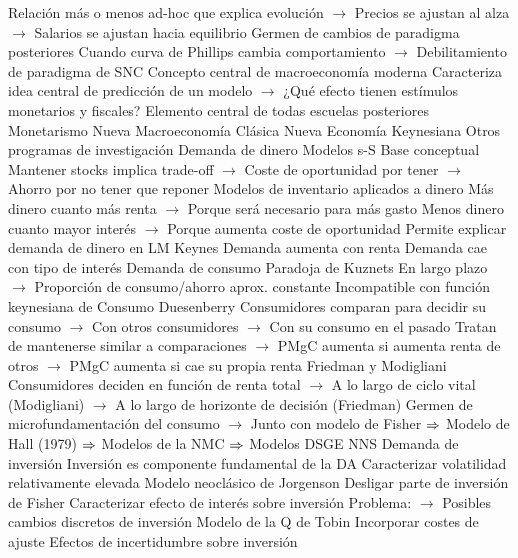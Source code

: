\documentclass{nuevotema}
\begin{document}
\begin{esquemal}
				\4[] Relación más o menos ad-hoc que explica evolución
				\4[] $\to$ Precios se ajustan al alza
				\4[] $\to$ Salarios se ajustan hacia equilibrio
				\4 Germen de cambios de paradigma posteriores
				\4[] Cuando curva de Phillips cambia comportamiento
				\4[] $\to$ Debilitamiento de paradigma de SNC
				\4 Concepto central de macroeconomía moderna
				\4[] Caracteriza idea central de predicción de un modelo
				\4[] $\to$ ¿Qué efecto tienen estímulos monetarios y fiscales?
				\4 Elemento central de todas escuelas posteriores
				\4[] Monetarismo
				\4[] Nueva Macroeconomía Clásica
				\4[] Nueva Economía Keynesiana
		\2 Otros programas de investigación
			\3 Demanda de dinero
				\4 Modelos s-S
				\4[] Base conceptual
				\4[] Mantener stocks implica trade-off
				\4[] $\to$ Coste de oportunidad por tener
				\4[] $\to$ Ahorro por no tener que reponer
				\4 Modelos de inventario aplicados a dinero
				\4[] Más dinero cuanto más renta
				\4[] $\to$ Porque será necesario para más gasto
				\4[] Menos dinero cuanto mayor interés
				\4[] $\to$ Porque aumenta coste de oportunidad
				\4 Permite explicar demanda de dinero en LM Keynes
				\4[] Demanda aumenta con renta
				\4[] Demanda cae con tipo de interés
			\3 Demanda de consumo
				\4 Paradoja de Kuznets
				\4[] En largo plazo
				\4[] $\to$ Proporción de consumo/ahorro aprox. constante
				\4[] Incompatible con función keynesiana de Consumo
				\4 Duesenberry
				\4[] Consumidores comparan para decidir su consumo
				\4[] $\to$ Con otros consumidores
				\4[] $\to$ Con su consumo en el pasado
				\4[] Tratan de mantenerse similar a comparaciones
				\4[] $\to$ PMgC aumenta si aumenta renta de otros
				\4[] $\to$ PMgC aumenta si cae su propia renta
				\4 Friedman y Modigliani
				\4[] Consumidores deciden en función de renta total
				\4[] $\to$ A lo largo de ciclo vital (Modigliani)
				\4[] $\to$ A lo largo de horizonte de decisión (Friedman)
				\4[] Germen de microfundamentación del consumo
				\4[] $\to$ Junto con modelo de Fisher
				\4[] $\Rightarrow$ Modelo de Hall (1979)
				\4[] $\Rightarrow$ Modelos de la NMC
				\4[] $\Rightarrow$ Modelos DSGE NNS
			\3 Demanda de inversión
				\4 Inversión es componente fundamental de la DA
				\4[] Caracterizar volatilidad relativamente elevada
				\4 Modelo neoclásico de Jorgenson
				\4[] Desligar parte de inversión de Fisher
				\4[] Caracterizar efecto de interés sobre inversión
				\4[] Problema:
				\4[] $\to$ Posibles cambios discretos de inversión
				\4 Modelo de la Q de Tobin
				\4[] Incorporar costes de ajuste
				\4[] Efectos de incertidumbre sobre inversión

\end{esquemal}
\end{document}
